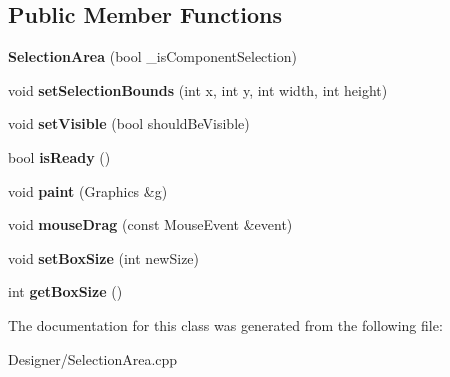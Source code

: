 \subsection*{Public Member Functions}
\begin{DoxyCompactItemize}
\item 
\hypertarget{class_selection_area_a8969a10e71d1675dd00de1015d9e1580}{{\bfseries Selection\-Area} (bool \-\_\-is\-Component\-Selection)}\label{class_selection_area_a8969a10e71d1675dd00de1015d9e1580}

\item 
\hypertarget{class_selection_area_aeede81851c600f718effb036859c448f}{void {\bfseries set\-Selection\-Bounds} (int x, int y, int width, int height)}\label{class_selection_area_aeede81851c600f718effb036859c448f}

\item 
\hypertarget{class_selection_area_ad6c2bd41ddd45e4e5a114c445664cb0e}{void {\bfseries set\-Visible} (bool should\-Be\-Visible)}\label{class_selection_area_ad6c2bd41ddd45e4e5a114c445664cb0e}

\item 
\hypertarget{class_selection_area_afb580cfc63418ee93ecf06bc3ae3dffe}{bool {\bfseries is\-Ready} ()}\label{class_selection_area_afb580cfc63418ee93ecf06bc3ae3dffe}

\item 
\hypertarget{class_selection_area_a7028c04b01c5c229510492e8d71399ea}{void {\bfseries paint} (Graphics \&g)}\label{class_selection_area_a7028c04b01c5c229510492e8d71399ea}

\item 
\hypertarget{class_selection_area_ae043b740d095421016b6b7e9bc2e8a64}{void {\bfseries mouse\-Drag} (const Mouse\-Event \&event)}\label{class_selection_area_ae043b740d095421016b6b7e9bc2e8a64}

\item 
\hypertarget{class_selection_area_aa25f2e2d5c4d54eedbb5567b4dcc9faf}{void {\bfseries set\-Box\-Size} (int new\-Size)}\label{class_selection_area_aa25f2e2d5c4d54eedbb5567b4dcc9faf}

\item 
\hypertarget{class_selection_area_acb552e98fe92a11f205f0c14eac69032}{int {\bfseries get\-Box\-Size} ()}\label{class_selection_area_acb552e98fe92a11f205f0c14eac69032}

\end{DoxyCompactItemize}


The documentation for this class was generated from the following file\-:\begin{DoxyCompactItemize}
\item 
Designer/Selection\-Area.\-cpp\end{DoxyCompactItemize}

